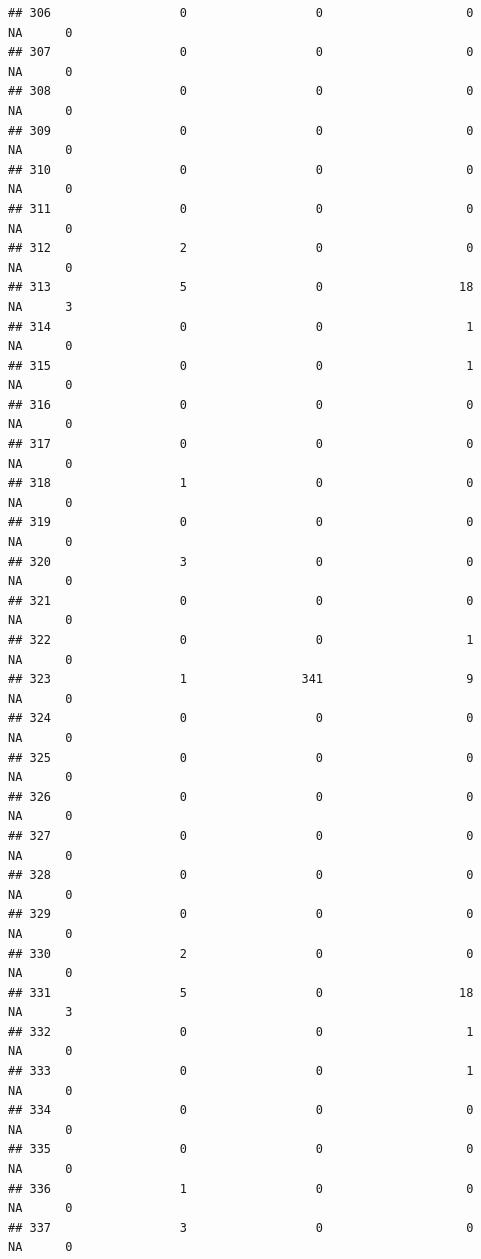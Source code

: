 \documentclass[
]{article}
\begin{document}
\begin{verbatim}
## 306                  0                  0                    0       NA      0
## 307                  0                  0                    0       NA      0
## 308                  0                  0                    0       NA      0
## 309                  0                  0                    0       NA      0
## 310                  0                  0                    0       NA      0
## 311                  0                  0                    0       NA      0
## 312                  2                  0                    0       NA      0
## 313                  5                  0                   18       NA      3
## 314                  0                  0                    1       NA      0
## 315                  0                  0                    1       NA      0
## 316                  0                  0                    0       NA      0
## 317                  0                  0                    0       NA      0
## 318                  1                  0                    0       NA      0
## 319                  0                  0                    0       NA      0
## 320                  3                  0                    0       NA      0
## 321                  0                  0                    0       NA      0
## 322                  0                  0                    1       NA      0
## 323                  1                341                    9       NA      0
## 324                  0                  0                    0       NA      0
## 325                  0                  0                    0       NA      0
## 326                  0                  0                    0       NA      0
## 327                  0                  0                    0       NA      0
## 328                  0                  0                    0       NA      0
## 329                  0                  0                    0       NA      0
## 330                  2                  0                    0       NA      0
## 331                  5                  0                   18       NA      3
## 332                  0                  0                    1       NA      0
## 333                  0                  0                    1       NA      0
## 334                  0                  0                    0       NA      0
## 335                  0                  0                    0       NA      0
## 336                  1                  0                    0       NA      0
## 337                  3                  0                    0       NA      0

\end{verbatim}
\end{document}
